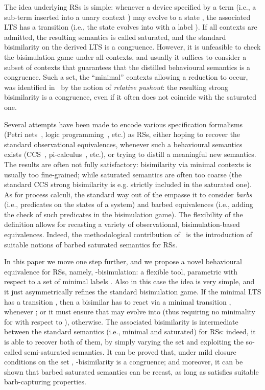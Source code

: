 \documentclass[copyright,creativecommons]{eptcs}
\newcommand{\<}{\langle}
\renewcommand{\>}{\rangle}
\begin{document}
The idea underlying RSs is simple: whenever a device specified by
a term  (i.e., a sub-term  inserted into a unary context
) may evolve to a state , the associated LTS has a transition
 (i.e., the state  evolves into  with a label
).
If all contexts are admitted, the resulting semantics is called
saturated, and the standard bisimilarity on the derived LTS is a
congruence.
However, it is unfeasible to check the bisimulation game under all
contexts, and usually it suffices to consider a subset of contexts
that guarantees that the distilled behavioural semantics is a
congruence.  Such a set, the ``minimal'' contexts allowing a reduction
to occur, was identified in~\cite{DBLP:conf/concur/LeiferM00} by the
notion of \emph{relative pushout}: the resulting strong bisimilarity
is a congruence, even if it often does not coincide with the saturated
one.

Several attempts have been made to encode various specification
formalisms (Petri nets~\cite{RobinBGPN,Sassone05}, logic
programming~\cite{LICS2006}, etc.) as RSs, either hoping to recover
the standard observational equivalences, whenever such a behavioural
semantics exists (CCS~\cite{MIL:CAC}, pi-calculus~\cite{Mil:PPCA},
etc.), or trying to distill a meaningful new semantics. The results
are often not fully satisfactory: bisimilarity via minimal contexts is
usually too fine-grained; while saturated semantics are often too
coarse (the standard CCS strong bisimilarity is e.g. strictly included
in the saturated one). As for process calculi, the standard way out of
the empasse it to consider \emph{barbs}~\cite{RobinICALP92} (i.e.,
predicates on the states of a system) and barbed equivalences
(i.e., adding the check of such predicates in the bisimulation game).
The flexibility
of the definition allows for recasting a variety of observational,
bisimulation-based equivalences. Indeed, the methodological
contribution of~\cite{BGMFOSSACS09} is the introduction of suitable
notions of barbed saturated semantics for RSs.

In this paper we move one step further, and we propose a novel
behavioural equivalence for RSs, namely, -bisimulation: a
flexible tool, parametric with respect to a set of minimal labels .
Also in this case the idea is very simple, and it just asymmetrically
refines the standard bisimulation game. If the minimal LTS has
a transition , then a bisimilar  has to react via
a minimal transition , whenever ;
or it must ensure that  may evolve into  (thus requiring no
minimality for  with respect to ), otherwise.
The associated bisimilarity is  intermediate between the standard semantics
(i.e., minimal and saturated)
for RSs: indeed, it is able to recover both of them, by simply
varying the set  and exploiting the so-called semi-saturated semantics.
It can be proved that, under mild closure conditions on the set ,
-bisimilarity is a congruence; and moreover, it can be shown
that  barbed saturated semantics can be recast, as long as 
satisfies suitable barb-capturing properties.
\end{document}
